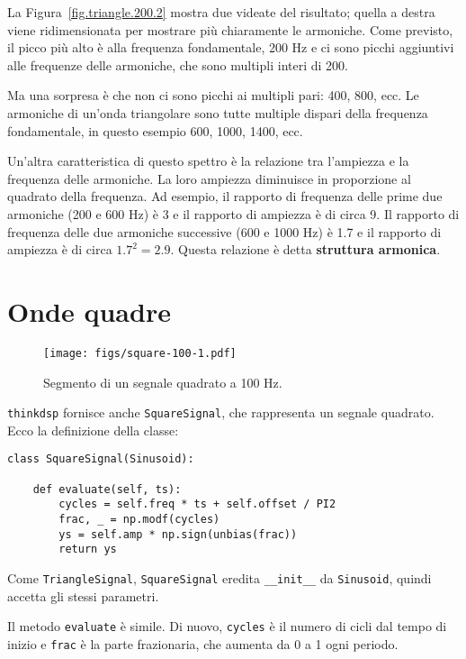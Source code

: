 \documentclass[12pt,a4paper]{book}
\begin{document}
La Figura~\ref{fig.triangle.200.2} mostra due videate del risultato; quella a destra viene ridimensionata per mostrare più chiaramente le armoniche. Come previsto, il picco più alto è alla frequenza fondamentale, 200 Hz e ci sono picchi aggiuntivi alle frequenze delle armoniche, che sono multipli interi di 200.

Ma una sorpresa è che non ci sono picchi ai multipli pari: 400, 800, ecc. Le armoniche di un'onda triangolare sono tutte multiple dispari della frequenza fondamentale, in questo esempio 600, 1000, 1400, ecc.

Un'altra caratteristica di questo spettro è la relazione tra l'ampiezza e la frequenza delle armoniche. La loro ampiezza diminuisce in proporzione al quadrato della frequenza. Ad esempio, il rapporto di frequenza delle prime due armoniche (200 e 600 Hz) è 3 e il rapporto di ampiezza è di circa 9. Il rapporto di frequenza delle due armoniche successive (600 e 1000 Hz) è 1.7 e il rapporto di ampiezza è di circa $1.7^2 = 2.9$. Questa relazione è detta {\bf struttura armonica}.

\section{Onde quadre} \label{square} 

\begin{figure} 

\centerline{\texttt{[image: figs/square-100-1.pdf]}} \caption{Segmento di un segnale quadrato a 100 Hz.} \label{fig.square.100.1} \end{figure} 

{\tt thinkdsp} fornisce anche {\tt SquareSignal}, che rappresenta un segnale quadrato. Ecco la definizione della classe:

\begin{verbatim} 
class SquareSignal(Sinusoid):

    def evaluate(self, ts):
        cycles = self.freq * ts + self.offset / PI2
        frac, _ = np.modf(cycles)
        ys = self.amp * np.sign(unbias(frac))
        return ys
 \end{verbatim} 

Come {\tt TriangleSignal}, {\tt SquareSignal} eredita \verb"__init__" da {\tt Sinusoid}, quindi accetta gli stessi parametri.

Il metodo {\tt evaluate} è simile. Di nuovo, {\tt cycles} è il numero di cicli dal tempo di inizio e {\tt frac} è la parte frazionaria, che aumenta da 0 a 1 ogni periodo.
\end{document}
